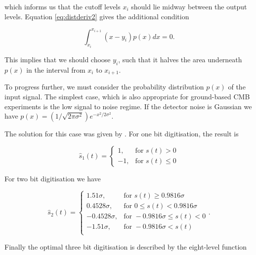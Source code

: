 \documentclass[apj]{emulateapj}
\begin{document}
which informs us that the cutoff levels $x_i$ should lie midway between the output levels. Equation \ref{eq:distderiv2} gives the additional condition

\begin{equation} \label{eq:digitareacondition}
\int_{x_i}^{x_{i+1}} \left( x-y_i \right) p(x) dx = 0.
\end{equation}

This implies that we should choose $y_i$, such that it halves the area underneath $p(x)$ in the interval from $x_i$ to $x_{i+1}$.

To progress further, we must consider the probability distribution $p(x)$ of the input signal. The simplest case, which is also appropriate for ground-based CMB experiments is the low signal to noise regime. If the detector noise is Gaussian we have $p(x) = (1/\sqrt{2\pi\sigma^2}) e^{-x^2/2\sigma^2}$.

The solution for this case was given by \cite{max1960}. For one bit digitisation, the result is

\begin{equation} \label{eq:1bit}
\hat{s}_1(t) = \left\{ \begin{array}{lr}
1, & \text{for } s(t) > 0\\
-1, & \text{for } s(t) \leq 0
\end{array} \right. \end{equation}

For two bit digitisation we have

\begin{equation}  \label{eq:2bit}
\hat{s}_2(t) = \left\{ \begin{array}{rl}
1.51 \sigma, & \text{for } s(t) \geq 0.9816 \sigma\\
0.4528 \sigma, & \text{for } 0 \leq s(t) < 0.9816 \sigma\\
-0.4528 \sigma, & \text{for } -0.9816 \sigma \leq s(t) < 0\\
-1.51 \sigma, & \text{for } -0.9816 \sigma < s(t)\\
\end{array} \right. . \end{equation}

Finally the optimal three bit digitisation is described by the eight-level function
\end{document}

